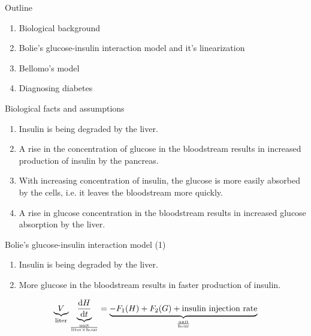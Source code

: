 \documentclass{beamer}
\providecommand{\m}[1]{\ensuremath{\mathrm{#1}}}
\begin{document}
\begin{frame}{Outline}
\begin{enumerate}
 \item Biological background
 \item Bolie's glucose-insulin interaction model and it's linearization
 \item Bellomo's model
 \item Diagnosing diabetes
\end{enumerate}


\end{frame}

\begin{frame}{Biological facts and assumptions}
\begin{enumerate}
	\item
	Insulin is being degraded by the liver.	
	\item
	A rise in the concentration of glucose in the bloodstream results in increased production of insulin by the pancreas.
	\item
	With increasing concentration of insulin, the glucose is more easily absorbed by the cells, i.e. it leaves the bloodstream more quickly.
	\item
	A rise in glucose concentration in the bloodstream results in increased glucose absorption by the liver.

\end{enumerate}
\end{frame}

\begin{frame}{Bolie's glucose-insulin interaction model (1)}

\begin{enumerate}
	\item
	Insulin is being degraded by the liver.	
	\item
	More glucose in the bloodstream results in faster production of insulin.
\end{enumerate}

\begin{align*}
\underbrace{V}_%
{\text{liter}}%
%
\underbrace{\frac{\m{d} H}{\m{d} t}}_%
{\frac{\text{unit}}{\text{liter} \times\text{hour}}}
=%
\underbrace{-F_1(H)+F_2(G)+\text{insulin injection rate}}%
_{\frac{\text{unit}}{\text{hour}}}
\end{align*}

\end{frame}
\end{document}
